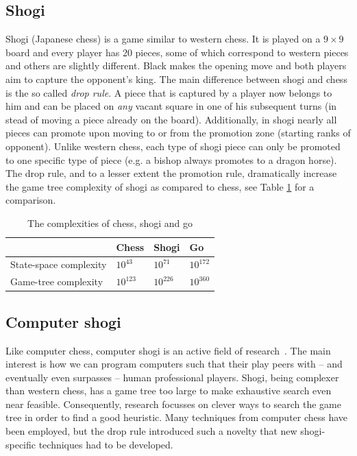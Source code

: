 \documentclass{article}
\begin{document}
\subsection{Shogi}
Shogi (Japanese chess\cite{shogibook}) is a game similar to western chess. It is played on a $9 \times 9$ board and every
player has 20 pieces, some of which correspond to western pieces and others are slightly different.
Black makes the opening move and both players aim to capture the opponent's king.
The main difference between shogi and chess is the so called \emph{drop rule}.
A piece that is captured by a player now belongs to him and can be placed on \textit{any} vacant square in one of his subsequent turns
(in stead of moving a piece already on the board).
Additionally, in shogi nearly all pieces can promote upon moving to or from the promotion zone (starting ranks of opponent).
Unlike western chess, each type of shogi piece can only be promoted to one specific type of piece (e.g. a bishop always promotes to a dragon horse).
The drop rule, and to a lesser extent the promotion rule, dramatically increase the game tree complexity of shogi as compared to chess, see Table
\ref{table:complex} for a comparison.\\
\begin{table}
\center
\begin{tabular}{l l l l}
 & Chess & Shogi & Go \\ \hline
State-space complexity & $10^{43}$ & $10^{71}$ & $10^{172}$ \\
Game-tree complexity & $10^{123}$ & $10^{226}$ & $10^{360}$ \\ \hline
\end{tabular}
\caption{The complexities of chess, shogi and go}
\label{table:complex}
\end{table}

\subsection{Computer shogi}
Like computer chess, computer shogi is an active field of research~\cite{iida2002computer}. The main interest is how we can program computers 
such that their play peers with -- and eventually even surpasses -- human professional players. Shogi, being complexer
than western chess, has a game tree too large to make exhaustive search even near feasible. Consequently, research
focusses on clever ways to search the game tree in order to find a good heuristic. Many techniques from computer chess
have been employed, but the drop rule introduced such a novelty that new shogi-specific techniques had to be developed.\\
\end{document}

